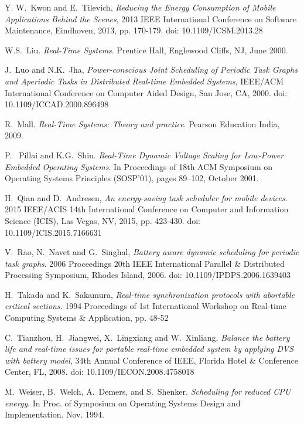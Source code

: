 \documentclass[10pt,article]{IEEEtran}
\begin{document}
\begin{thebibliography}{1}
Y. W.~Kwon and E.~Tilevich, \emph{Reducing the Energy Consumption of Mobile Applications Behind the Scenes}, 2013 IEEE International Conference on Software Maintenance, Eindhoven, 2013, pp. 170-179. doi: 10.1109/ICSM.2013.28

W.S.~Liu. \emph{Real-Time Systems}. Prentice Hall, Englewood Cliffs, NJ, June 2000.

J.~Luo and N.K.~Jha, \emph{Power-conscious Joint Scheduling of Periodic Task Graphs and Aperiodic Tasks in Distributed Real-time Embedded Systems}, IEEE/ACM International Conference on Computer Aided Design, San Jose, CA, 2000. doi: 10.1109/ICCAD.2000.896498

R.~Mall. \emph{Real-Time Systems: Theory and practice}. Pearson Education India, 2009.

P.~ Pillai and K.G.~Shin. \emph{Real-Time Dynamic Voltage Scaling
for Low-Power Embedded Operating Systems}.  In Proceedings of 18th ACM Symposium on Operating Systems Principles (SOSP’01), pages 89–102, October 2001.

H.~Qian and D.~Andresen, \emph{An energy-saving task scheduler for mobile devices}. 2015 IEEE/ACIS 14th International Conference on Computer and Information Science (ICIS), Las Vegas, NV, 2015, pp. 423-430.
doi: 10.1109/ICIS.2015.7166631

V.~Rao, N.~Navet and G.~Singhal, \emph{Battery aware dynamic scheduling for periodic task graphs}. 2006 Proceedings 20th IEEE International Parallel \& Distributed Processing Symposium, Rhodes Island, 2006. doi: 10.1109/IPDPS.2006.1639403  

H.~Takada and K.~Sakamura, \emph{Real-time synchronization protocols with abortable critical sections}. 1994 Proceedings of 1st International Workshop on Real-time Computing Systems \& Application, pp. 48-52

C.~Tianzhou, H.~Jiangwei, X.~Lingxiang and W.~Xinliang, \emph{Balance the battery life and real-time issues for portable real-time embedded system by applying DVS with battery model}, 34th Annual Conference of IEEE, Florida Hotel \& Conference Center, FL, 2008. doi: 10.1109/IECON.2008.4758018

M.~Weiser, B.~Welch, A.~Demers, and S.~Shenker. \emph{Scheduling for reduced CPU energy}. In Proc. of Symposium on Operating Systems Design and Implementation. Nov. 1994.
    

\end{thebibliography}
\end{document}
